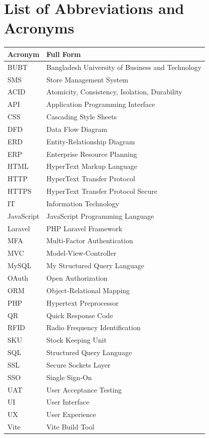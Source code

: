 \chapter*{List of Abbreviations and Acronyms}

\begin{table}[h]
\centering
\begin{tabular}{p{1in} p{4in}}
\toprule
\textbf{Acronym} & \textbf{Full Form}\\
\midrule
BUBT & Bangladesh University of Business and Technology\\
SMS & Store Management System\\
ACID & Atomicity, Consistency, Isolation, Durability\\
API & Application Programming Interface\\
CSS & Cascading Style Sheets\\
DFD & Data Flow Diagram\\
ERD & Entity-Relationship Diagram\\
ERP & Enterprise Resource Planning\\
HTML & HyperText Markup Language\\
HTTP & HyperText Transfer Protocol\\
HTTPS & HyperText Transfer Protocol Secure\\
IT & Information Technology\\
JavaScript & JavaScript Programming Language\\
Laravel & PHP Laravel Framework\\
MFA & Multi-Factor Authentication\\
MVC & Model-View-Controller\\
MySQL & My Structured Query Language\\
OAuth & Open Authorization\\
ORM & Object-Relational Mapping\\
PHP & Hypertext Preprocessor\\
QR & Quick Response Code\\
RFID & Radio Frequency Identification\\
SKU & Stock Keeping Unit\\
SQL & Structured Query Language\\
SSL & Secure Sockets Layer\\
SSO & Single Sign-On\\
UAT & User Acceptance Testing\\
UI & User Interface\\
UX & User Experience\\
Vite & Vite Build Tool\\
\bottomrule
\end{tabular}
\end{table}